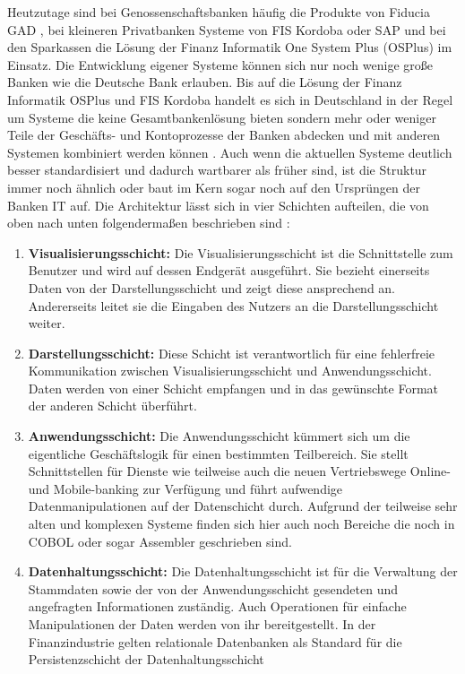 \documentclass[12pt,oneside,a4paper,parskip]{scrbook}
\begin{document}
Heutzutage sind bei Genossenschaftsbanken häufig die Produkte von Fiducia GAD \cite{fiducia}, bei kleineren Privatbanken Systeme von FIS Kordoba \cite{kordoba} oder SAP \cite{SAP} und bei den Sparkassen die Lösung der Finanz Informatik One System Plus (OSPlus) \cite{finanzinformatik} im Einsatz. Die Entwicklung eigener Systeme können sich nur noch wenige große Banken wie die Deutsche Bank erlauben. Bis auf die Lösung der Finanz Informatik OSPlus und FIS Kordoba handelt es sich in Deutschland in der Regel um Systeme die keine Gesamtbankenlösung bieten sondern mehr oder weniger Teile der Geschäfts- und Kontoprozesse der Banken abdecken und mit anderen Systemen kombiniert werden können \cite{einfuehrungKernbanksystem}\cite[56-58]{ITidF}. Auch wenn die aktuellen Systeme deutlich besser standardisiert und dadurch wartbarer als früher sind, ist die Struktur immer noch ähnlich oder baut im Kern sogar noch auf den Ursprüngen der Banken IT auf. Die Architektur lässt sich in vier Schichten aufteilen, die von oben nach unten folgendermaßen beschrieben sind \cite[104]{ITidF}:

\begin{enumerate}
\item \textbf{Visualisierungsschicht:} Die Visualisierungsschicht ist die Schnittstelle zum Benutzer und wird auf dessen Endgerät ausgeführt. Sie bezieht einerseits Daten von der Darstellungsschicht und zeigt diese ansprechend an. Andererseits leitet sie die Eingaben des Nutzers an die Darstellungsschicht weiter.
\item \textbf{Darstellungsschicht:} Diese Schicht ist verantwortlich für eine fehlerfreie Kommunikation zwischen Visualisierungsschicht und Anwendungsschicht. Daten werden von einer Schicht empfangen und in das gewünschte Format der anderen Schicht überführt.
\item \textbf{Anwendungsschicht:} Die Anwendungsschicht kümmert sich um die eigentliche Geschäftslogik für einen bestimmten Teilbereich. Sie stellt Schnittstellen für Dienste wie teilweise auch die neuen Vertriebswege Online- und Mobile-banking zur Verfügung und führt aufwendige Datenmanipulationen auf der Datenschicht durch. Aufgrund der teilweise sehr alten und komplexen Systeme finden sich hier auch noch Bereiche die noch in COBOL oder sogar Assembler geschrieben sind.
\item \textbf{Datenhaltungsschicht:} Die Datenhaltungsschicht ist für die Verwaltung der Stammdaten sowie der von der Anwendungsschicht gesendeten und angefragten Informationen zuständig. Auch Operationen für einfache Manipulationen der Daten werden von ihr bereitgestellt. In der Finanzindustrie gelten relationale Datenbanken als Standard für die Persistenzschicht der Datenhaltungsschicht \cite[105]{ITidF}\cite{MarkstudieKernbankensysteme}
\end{enumerate}
\end{document}
